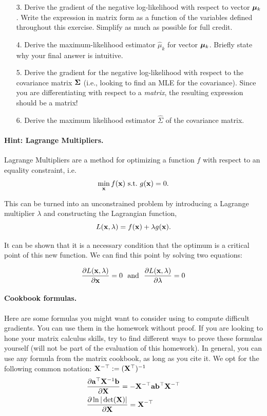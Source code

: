 \documentclass[submit]{harvardml}
\begin{document}
\begin{problem}
    \begin{enumerate}
  \item[3.] Derive the gradient of the negative log-likelihood with respect to vector $\boldsymbol{\mu}_k$.
    Write the expression in matrix form as a function of the variables defined
    throughout this exercise. Simplify as much as possible for full credit.
  \item[4.] Derive the maximum-likelihood estimator $\hat{\mu}_k$ for vector $\boldsymbol{\mu}_k$. Briefly state why your final answer is intuitive.
  \item[5.] Derive the gradient for the negative log-likelihood with respect to the
    covariance matrix $\mathbf{\Sigma}$ (i.e., looking
to find an MLE for the covariance).
Since you are differentiating with respect to a
    \emph{matrix}, the resulting expression should be a matrix!
%
  \item[6.] Derive the maximum likelihood estimator $\hat{\Sigma}$ of the covariance matrix.
\end{enumerate}

\paragraph{Hint: Lagrange Multipliers.} Lagrange Multipliers are a method for
optimizing a function $f$ with respect to an
equality constraint, i.e.
\[\min_{\mathbf{x}} f(\mathbf{x})\ \text{s.t.}\ g(\mathbf{x}) = 0.\]

This can be turned into an unconstrained problem by introducing a
Lagrange multiplier $\lambda$ and constructing the Lagrangian function,
\[L(\mathbf{x}, \lambda) =  f(\mathbf{x}) + \lambda g(\mathbf{x}).\]

It can be shown that it is a necessary condition that the optimum
is a critical point of this new function. We can find this point by solving two equations:

\[\frac{\partial L(\mathbf{x}, \lambda)}{\partial  \mathbf{x}} = 0  \ \ \text{and}\  \  \frac{\partial L(\mathbf{x}, \lambda)}{\partial \lambda} = 0 \]


\paragraph{Cookbook formulas.} Here are some formulas you might want to consider
using to compute difficult gradients. You can use them  in the homework
without proof. If you are looking to hone your matrix calculus skills, try to
find different ways to prove these formulas yourself (will not be part of the
evaluation of this homework). In general, you can use any formula from the matrix cookbook,
as long as you cite it. We opt for the following common notation:
$\mathbf{X}^{-\top} := (\mathbf{X}^{\top})^{-1}$
\begin{align*}
  & \frac{\partial \mathbf{a}^\top \mathbf{X}^{-1} \mathbf{b}}{\partial \mathbf{X}} = - \mathbf{X}^{-\top} \mathbf{a} \mathbf{b}^\top \mathbf{X}^{-\top} \\
  & \frac{\partial \ln | \det (\mathbf{X}) |}{\partial \mathbf{X}} = \mathbf{X}^{-\top}
 \end{align*}
 \end{problem}
\end{document}
